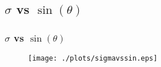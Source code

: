 \documentclass{beamer}
\begin{document}
\subsection{\texorpdfstring{$\sigma$}{sigma} vs \texorpdfstring{$\sin(\theta)$}{sin(theta)}}
\begin{frame}\frametitle{$\sigma$ vs $\sin(\theta)$ }
\begin{figure}
\texttt{[image: ./plots/sigmavssin.eps]} 
\end{figure}
\end{frame}
\end{document}
